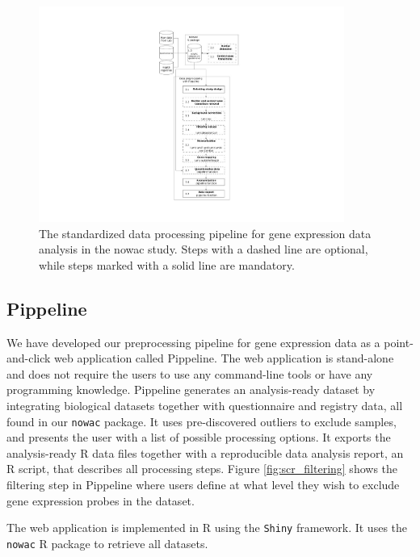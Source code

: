 \begin{figure}
    \centering
    \includegraphics[width=10cm]{figures/uit_pippeline_rm_refs.pdf}
    \caption[Standardized data processing pipeline]{The standardized data
    processing pipeline for gene expression data analysis in the \gls{nowac}
    study. Steps with a dashed line are optional, while steps marked with a
    solid line are mandatory.}
    \label{fig:uit_pippeline}
\end{figure}


\subsection{Pippeline} 
We have developed our preprocessing pipeline for gene expression data as a
point-and-click web application called Pippeline. The web application is
stand-alone and does not require the users to use any command-line tools or have
any programming knowledge. Pippeline generates an analysis-ready dataset by
integrating biological datasets together with questionnaire and registry data,
all found in our \texttt{nowac} package. It uses pre-discovered outliers to
exclude samples, and presents the user with a list of possible processing
options. It exports the analysis-ready R data files together with a reproducible
data analysis report, an R script, that describes all processing steps.  Figure
\ref{fig:scr_filtering} shows the filtering step in Pippeline where users define
at what level they wish to exclude gene expression probes in the dataset. 

The web application is implemented in R using the \texttt{Shiny} framework. It
uses the \texttt{nowac} R package to retrieve all datasets. 

